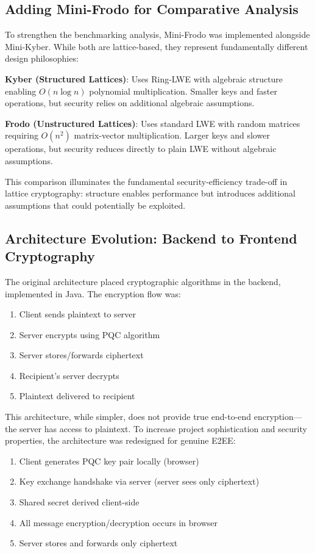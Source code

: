 \documentclass[11pt,a4paper]{article}
\begin{document}
\subsection{Adding Mini-Frodo for Comparative Analysis}

To strengthen the benchmarking analysis, Mini-Frodo was implemented alongside Mini-Kyber. While both are lattice-based, they represent fundamentally different design philosophies:

\textbf{Kyber (Structured Lattices)}: Uses Ring-LWE with algebraic structure enabling $O(n \log n)$ polynomial multiplication. Smaller keys and faster operations, but security relies on additional algebraic assumptions.

\textbf{Frodo (Unstructured Lattices)}: Uses standard LWE with random matrices requiring $O(n^2)$ matrix-vector multiplication. Larger keys and slower operations, but security reduces directly to plain LWE without algebraic assumptions.

This comparison illuminates the fundamental security-efficiency trade-off in lattice cryptography: structure enables performance but introduces additional assumptions that could potentially be exploited.

\subsection{Architecture Evolution: Backend to Frontend Cryptography}

The original architecture placed cryptographic algorithms in the backend, implemented in Java. The encryption flow was:
\begin{enumerate}
    \item Client sends plaintext to server
    \item Server encrypts using PQC algorithm
    \item Server stores/forwards ciphertext
    \item Recipient's server decrypts
    \item Plaintext delivered to recipient
\end{enumerate}

This architecture, while simpler, does not provide true end-to-end encryption---the server has access to plaintext. To increase project sophistication and security properties, the architecture was redesigned for genuine E2EE:

\begin{enumerate}
    \item Client generates PQC key pair locally (browser)
    \item Key exchange handshake via server (server sees only ciphertext)
    \item Shared secret derived client-side
    \item All message encryption/decryption occurs in browser
    \item Server stores and forwards only ciphertext
\end{enumerate}
\end{document}
